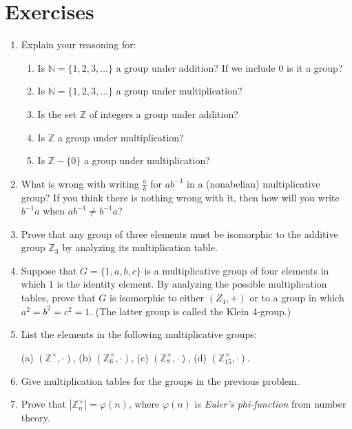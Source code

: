 \documentclass[11pt]{article}
\newenvironment{problems}
{
 \begin{enumerate}[topsep=1pt,itemsep=0pt,parsep=2pt,leftmargin=0.6cm,%
 label={\arabic*.}, ref=\arabic*] \small
}
{
 \end{enumerate}
}
\theoremstyle{definition}
\newcommand{\Z}{\mathbb{Z}} %
\newcommand{\N}{\mathbb{N}} %
\begin{document}
\section*{Exercises}
\begin{problems}\small

\item Explain your reasoning for:
\begin{enumerate}
\item Is $\N = \{1,2,3,\dots \}$ a group under addition? If we
  include $0$ is it a group?
\item Is $\N= \{1,2,3,\dots \}$ a group under multiplication?
\item Is the set $\Z$ of integers a group under addition? 
\item Is $\Z$ a group under multiplication? 
\item Is $\Z-\{0\}$ a group under multiplication? 
\end{enumerate}


\item What is wrong with writing $\frac{a}{b}$ for $ab^{-1}$ in a
  (nonabelian) multiplicative group? If you think there is nothing
  wrong with it, then how will you write $b^{-1} a$ when $ab^{-1} \ne
  b^{-1}a$?

\item Prove that any group of three elements must be isomorphic to
  the additive group $\Z_3$ by analyzing its multiplication table.

\item Suppose that $G = \{1,a,b,c\}$ is a multiplicative group of four
  elements in which $1$ is the identity element. By analyzing the
  possible multiplication tables, prove that $G$ is isomorphic to
  either $(Z_4,+)$ or to a group in which $a^2=b^2=c^2=1$. (The latter
  group is called the Klein 4-group.)

\item List the elements in the following multiplicative groups:

(a) $(\Z^\times,\cdot)$,\qquad
(b) $(\Z_6^\times, \cdot)$,\qquad
(c) $(\Z_8^\times, \cdot)$,\qquad
(d) $(\Z_{15}^\times, \cdot)$.

\item Give multiplication tables for the groups in the previous
  problem.

\item Prove that $|\Z_n^\times| = \varphi(n)$, where $\varphi(n)$ is
  \emph{Euler's phi-function} from number theory.


\end{problems}
\end{document}
